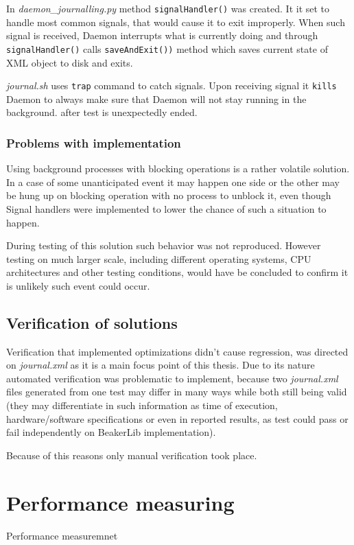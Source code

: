 In \textit{daemon\_journalling.py} method \texttt{signalHandler()} was created. It it set to handle most common signals, that would cause it to exit improperly. When such signal is received, Daemon interrupts what is currently doing and through \texttt{signalHandler()} calls \texttt{saveAndExit())} method which saves current state of XML object to disk and exits.

\textit{journal.sh} uses \texttt{trap} command to catch signals. Upon receiving signal it \texttt{kills} Daemon to always make sure that Daemon will not stay running in the background. after test is unexpectedly ended.  

\subsection{Problems with implementation}
Using background processes with blocking operations is a rather volatile solution. In a case of some unanticipated event it may happen one side or the other may be hung up on blocking operation with no process to unblock it, even though Signal handlers were implemented to lower the chance of such a situation to happen.

During testing of this solution such behavior was not reproduced. However testing on much larger scale, including different operating systems, CPU architectures and other testing conditions, would have be concluded to confirm it is unlikely such event could occur. 

\section{Verification of solutions}
Verification that implemented optimizations didn't cause regression, was directed on \textit{journal.xml} as it is a main focus point of this thesis. Due to its nature automated verification was problematic to implement, because two \textit{journal.xml} files generated from one test may differ in many ways while both still being valid (they may differentiate in such information as time of execution, hardware/software specifications or even in reported results, as test could pass or fail independently on BeakerLib implementation).

Because of this reasons only manual verification took place.

\chapter{Performance measuring}
\label{performance}
Performance measuremnet 


